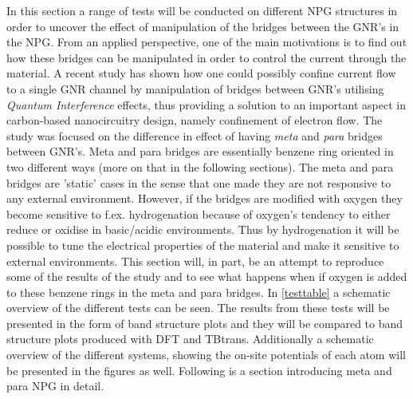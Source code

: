 In this section a range of tests will be conducted on different NPG structures in order to uncover the effect of manipulation of the bridges between the GNR's in the NPG. From an applied perspective, one of the main motivations is to find out how these bridges can be manipulated in order to control the current through the material. A recent study has shown how one could possibly confine current flow to a single GNR channel by manipulation of bridges between GNR's utilising \textit{Quantum Interference} effects, thus providing a solution to an important aspect in carbon-based nanocircuitry design, namely confinement of electron flow. The study was focused on the difference in effect of having \textit{meta} and \textit{para} bridges between GNR's. Meta and para bridges are essentially benzene ring oriented in two different ways (more on that in the following sections). The meta and para bridges are 'static' cases in the sense that one made they are not responsive to any external environment. However, if the bridges are modified with oxygen they become sensitive to f.ex. hydrogenation because of oxygen's tendency to either reduce or oxidise in basic/acidic environments. Thus by hydrogenation it will be possible to tune the electrical properties of the material and make it sensitive to external environments. This section will, in part, be an attempt to reproduce some of the results of the study and to see what happens when if oxygen is added to these benzene rings in the meta and para bridges.  In \cref{testtable} a schematic overview of the different tests can be seen. The results from these tests will be presented in the form of band structure plots and they will be compared to band structure plots produced with DFT and TBtrans. Additionally a schematic overview of the different systems, showing the on-site potentials of each atom will be presented in the figures as well. Following is a section introducing meta and para NPG in detail. 
